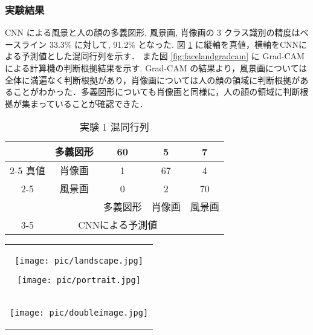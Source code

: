 \documentclass[twocolumn]{jarticle}     %
\newcommand{\1}{\mbox{1}\hspace{-0.25em}\mbox{l}}
\begin{document}
\subsubsection{実験結果}
CNN による風景と人の顔の多義図形, 風景画, 肖像画の 3 クラス識別の精度はベースライン 33.3\% に対して, 91.2\% となった. 図 \ref{tab:heatmap} に縦軸を真値，横軸をCNNによる予測値とした混同行列を示す．
また図 \ref{fig:facelandgradcam} に Grad-CAM による計算機の判断根拠結果を示す. Grad-CAM の結果より，風景画については全体に満遍なく判断根拠があり，肖像画については人の顔の領域に判断根拠があることがわかった．多義図形についても肖像画と同様に，人の顔の領域に判断根拠が集まっていることが確認できた．
\begin{table}[t]
	\begin{center}
		\caption{実験 1 混同行列}
		\label{tab:heatmap}
		\begin{tabular}{|c|c|c|c|c|} \hline
			&多義図形&60&5&7\\ \cline{2-5}
			真値&肖像画&1&67&4\\ \cline{2-5}
			&風景画&0&2&70\\ \hline
			\multicolumn{2}{|c|}{}&多義図形&肖像画&風景画\\ \cline{3-5}
			\multicolumn{2}{|c|}{}&\multicolumn{3}{|c|}{CNNによる予測値}\\ \hline
		\end{tabular}
	\end{center}
\end{table}

\begin{figure*}[t]
	\begin{center}
		\begin{tabular}{c}
			\begin{minipage}{0.5\hsize}
				\begin{center}
					\texttt{[image: pic/landscape.jpg]}
				\end{center}
			\end{minipage}
			\begin{minipage}{0.5\hsize}
				\begin{center}					
					\texttt{[image: pic/portrait.jpg]}
				\end{center}
			\end{minipage}			
			\\
			\begin{minipage}{0.5\hsize}
				\begin{center}
					\texttt{[image: pic/doubleimage.jpg]}	
				\end{center}
			\end{minipage}
		\end{tabular}
	\end{center}
	\caption{実験 1 Grad-CAM の結果の例}
	\label{fig:facelandgradcam}
\end{figure*}
\end{document}
